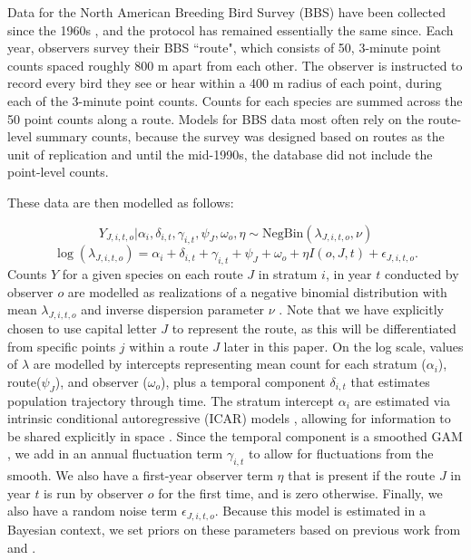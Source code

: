 \par Data for the North American Breeding Bird Survey (BBS) have been collected since the 1960s \citep{hudson_role_2017, sauer_first_2017}, and the protocol has remained essentially the same since. 
Each year, observers survey their BBS ``route", which consists of 50, 3-minute point counts spaced roughly 800 m apart from each other. 
The observer is instructed to record every bird they see or hear within a 400 m radius of each point, during each of the 3-minute point counts. 
Counts for each species are summed across the 50 point counts along a route.
Models for BBS data most often rely on the route-level summary counts, because the survey was designed based on routes as the unit of replication and until the mid-1990s, the database did not include the point-level counts.

\par These data are then modelled as follows:

\begin{equation*}
	Y_{J,i,t,o} | \alpha_i, \delta_{i,t}, \gamma_{i,t}, \psi_J, \omega_o, \eta \sim \text{NegBin}(\lambda_{J,i,t,o}, \nu)
\end{equation*}
\begin{equation}\label{bbs}
\log(\lambda_{J,i,t,o}) = \alpha_i + \delta_{i,t} + \gamma_{i,t} + \psi_J + \omega_o + \eta I(o,J,t) + \epsilon_{J,i,t,o}.
\end{equation}
Counts $Y$ for a given species on each route $J$ in stratum $i$, in year $t$ conducted by observer $o$ are modelled as realizations of a negative binomial distribution with mean $\lambda_{J,i,t,o}$ and inverse dispersion parameter $\nu$ \citet{smith_spatially_2023}. 
Note that we have explicitly chosen to use capital letter $J$ to represent the route, as this will be differentiated from specific points $j$ within a route $J$ later in this paper.
On the log scale, values of $\lambda$ are modelled by intercepts representing mean count for each stratum ($\alpha_i$), route($\psi_J$), and observer ($\omega_o$), plus a temporal component $\delta_{i,t}$ that estimates population trajectory through time. 
The stratum intercept $\alpha_i$ are estimated via intrinsic conditional autoregressive (ICAR) models \citep{besag_bayesian_1991}, allowing for information to be shared explicitly in space \citep{smith_spatially_2023}.
Since the temporal component is a smoothed GAM \citep{smith_north_2021}, we add in an annual fluctuation term $\gamma_{i,t}$ to allow for fluctuations from the smooth. 
We also have a first-year observer term $\eta$ that is present if the route $J$ in year $t$ is run by observer $o$ for the first time, and is zero otherwise. 
Finally, we also have a random noise term $\epsilon_{J,i,t,o}$.
Because this model is estimated in a Bayesian context, we set priors on these parameters based on previous work from \citet{smith_north_2021} and \citet{smith_spatially_2023}.

